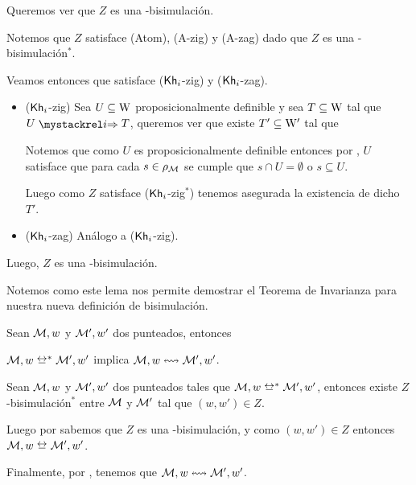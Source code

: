 \begin{demostracion}
    Queremos ver que $Z$ es una \KHilogic-bisimulación.

    Notemos que $Z$ satisface (Atom), (A-zig) y (A-zag) dado que $Z$ es una \KHilogic-bisimulación$^*$.

    Veamos entonces que satisface ($\mathsf{Kh}_i$-zig) y ($\mathsf{Kh}_i$-zag).

    \begin{itemize}
        \item ($\mathsf{Kh}_i$-zig) Sea $U \subseteq \mathrm{W}$ proposicionalmente definible y sea $T \subseteq \mathrm{W}$ tal que $U \ultsExecAgi T$, queremos ver que existe
        $T' \subseteq \mathrm{W}'$ tal que

        \begin{multicols}{2}
        \end{multicols}
        Notemos que como $U$ es proposicionalmente definible entonces por , $U$ satisface que para cada $s \in \rho_{\mathcal{M}}$ se cumple
        que $s \cap U = \emptyset$ o $s \subseteq U$.
    
        Luego como $Z$ satisface ($\mathsf{Kh}_i$-zig$^*$) tenemos asegurada la existencia de dicho $T'$.
    
        \item ($\mathsf{Kh}_i$-zag) Análogo a ($\mathsf{Kh}_i$-zig).
    \end{itemize}

    Luego, $Z$ es una \KHilogic-bisimulación.
\end{demostracion}

Notemos como este lema nos permite demostrar el Teorema de Invarianza para nuestra nueva definición de bisimulación.

\begin{teorema}
    Sean $\mathcal{M},w$ y $\mathcal{M}',w'$ dos \ultss punteados, entonces
    \begin{center}
        $\modults,w \bisim^* \modults',w'$ implica $\mathcal{M},w \mathrel{\leftrightsquigarrow} \mathcal{M}',w'$.
    \end{center}
\end{teorema}

\begin{demostracion}
    Sean $\mathcal{M},w$ y $\mathcal{M}',w'$ dos \ultss punteados tales que $\modults,w \bisim^* \modults',w'$, entonces existe $Z$ \KHilogic-bisimulación$^*$
    entre $\mathcal{M}$ y $\mathcal{M}'$ tal que $(w,w') \in Z$.
    
    Luego por  sabemos que $Z$ es una \KHilogic-bisimulación, y como $(w,w') \in Z$ entonces $\modults,w \bisim \modults',w'$.

    Finalmente, por , tenemos que $\mathcal{M},w \mathrel{\leftrightsquigarrow} \mathcal{M}',w'$.
\end{demostracion}

